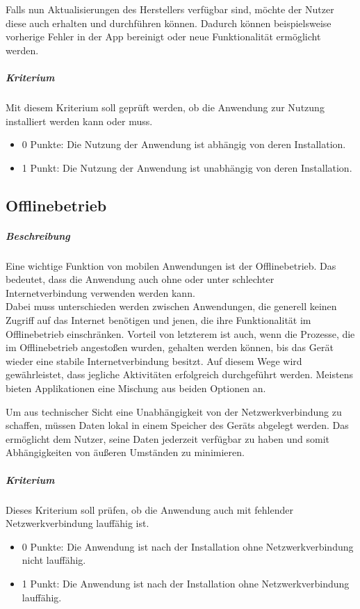 Falls nun Aktualisierungen des Herstellers verfügbar sind, möchte der Nutzer diese auch erhalten und durchführen können.
Dadurch können beispielsweise vorherige Fehler in der App bereinigt oder neue Funktionalität ermöglicht werden.

\subparagraph{Kriterium\\}
Mit diesem Kriterium soll geprüft werden, ob die Anwendung zur Nutzung installiert werden kann oder muss.

\begin{itemize}
\item 0 Punkte: Die Nutzung der Anwendung ist abhängig von deren Installation.
\item 1 Punkt: Die Nutzung der Anwendung ist unabhängig von deren Installation.
\end{itemize}

\subsection{Offlinebetrieb}
\subparagraph{Beschreibung\\}
Eine wichtige Funktion von mobilen Anwendungen ist der Offlinebetrieb.
Das bedeutet, dass die Anwendung auch ohne oder unter schlechter Internetverbindung verwenden werden kann.\\
Dabei muss unterschieden werden zwischen Anwendungen, die generell keinen Zugriff auf das Internet benötigen und jenen, die ihre Funktionalität im Offlinebetrieb einschränken.
Vorteil von letzterem ist auch, wenn die Prozesse, die im Offlinebetrieb angestoßen wurden, gehalten werden können, bis das Gerät wieder eine stabile Internetverbindung besitzt.
Auf diesem Wege wird gewährleistet, dass jegliche Aktivitäten erfolgreich durchgeführt werden.
Meistens bieten Applikationen eine Mischung aus beiden Optionen an.

Um aus technischer Sicht eine Unabhängigkeit von der Netzwerkverbindung zu schaffen, müssen Daten lokal in einem Speicher des Geräts abgelegt werden.
Das ermöglicht dem Nutzer, seine Daten jederzeit verfügbar zu haben und somit Abhängigkeiten von äußeren Umständen zu minimieren.

\subparagraph{Kriterium\\}
Dieses Kriterium soll prüfen, ob die Anwendung auch mit fehlender Netzwerkverbindung lauffähig ist.

\begin{itemize}
\item 0 Punkte: Die Anwendung ist nach der Installation ohne Netzwerkverbindung nicht lauffähig.
\item 1 Punkt: Die Anwendung ist nach der Installation ohne Netzwerkverbindung lauffähig.
\end{itemize}

